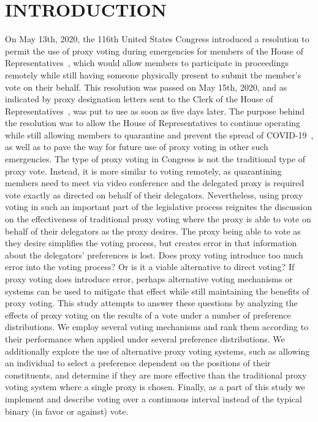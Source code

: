 %
%

\chapter{INTRODUCTION}\label{ch:introduction}
\thispagestyle{empty}
On May 13th, 2020, the 116th United States Congress introduced a resolution
to permit the use of proxy voting during emergencies for members of the House of
Representatives~\cite{Congress.gov2020}, which would allow members to participate in
proceedings remotely while still having someone physically present to submit the
member's vote on their behalf.
This resolution was passed on May 15th, 2020, and as indicated by proxy designation
letters sent to the Clerk of the House of Representatives~\cite{Clerk.House.gov2022},
was put to use as soon as five days later.
The purpose behind the resolution was to allow the House of Representatives
to continue operating while still allowing members to quarantine and prevent the
spread of COVID-19~\cite{Congress.gov2020}, as well as to pave the way for future use
of proxy voting in other such emergencies.
The type of proxy voting in Congress is not the traditional type of proxy vote.
Instead, it is more similar to voting remotely, as quarantining members need to
meet via video conference and the delegated proxy is required vote exactly as
directed on behalf of their delegators.
Nevertheless, using proxy voting in such an important part of the legislative process
reignites the discussion on the effectiveness of traditional proxy voting where the
proxy is able to vote on behalf of their delegators as the proxy desires.
The proxy being able to vote as they desire simplifies the voting process, but
creates error in that information about the delegators' preferences is lost.
Does proxy voting introduce too much error into the voting process?
Or is it a viable alternative to direct voting?
If proxy voting does introduce error, perhaps alternative voting mechanisms or systems
can be used to mitigate that effect while still maintaining the benefits of proxy
voting.
This study attempts to answer these questions by analyzing the effects of proxy
voting on the results of a vote under a number of preference distributions.
We employ several voting mechanisms and rank them according to their performance when
applied under several preference distributions.
We additionally explore the use of alternative proxy voting systems, such as
allowing an individual to select a preference dependent on the positions of their
constituents, and determine if they are more effective than the traditional proxy
voting system where a single proxy is chosen.
Finally, as a part of this study we implement and describe voting over a continuous
interval instead of the typical binary (in favor or against) vote.

